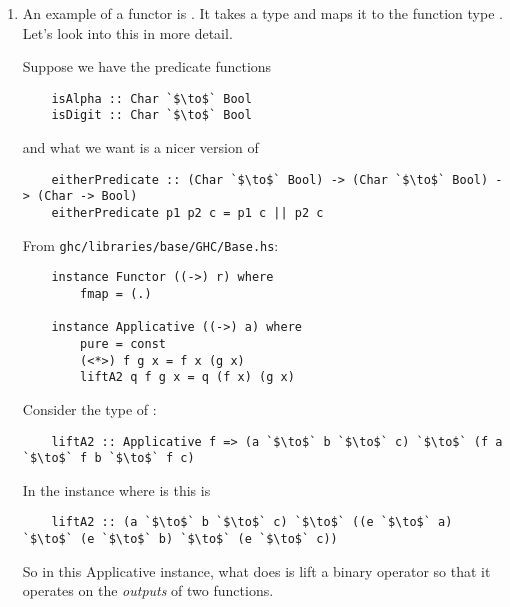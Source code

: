 \documentclass[12pt]{article}
\begin{document}
\begin{example*}\hspace{0pt}
  \begin{enumerate}

  \item An example of a functor is . It takes a type  and maps it to the
    function type . Let's look into this in more detail.

    Suppose we have the predicate functions
    \begin{verbatim}
    isAlpha :: Char `$\to$` Bool
    isDigit :: Char `$\to$` Bool
    \end{verbatim}
    and what we want is a nicer version of
    \begin{verbatim}
    eitherPredicate :: (Char `$\to$` Bool) -> (Char `$\to$` Bool) -> (Char -> Bool)
    eitherPredicate p1 p2 c = p1 c || p2 c
    \end{verbatim}

    \begin{mdframed}
    From {\tt ghc/libraries/base/GHC/Base.hs}:
    \begin{verbatim}
    instance Functor ((->) r) where
        fmap = (.)

    instance Applicative ((->) a) where
        pure = const
        (<*>) f g x = f x (g x)
        liftA2 q f g x = q (f x) (g x)
    \end{verbatim}
    \end{mdframed}

    Consider the type of :
    \begin{verbatim}
    liftA2 :: Applicative f => (a `$\to$` b `$\to$` c) `$\to$` (f a `$\to$` f b `$\to$` f c)
    \end{verbatim}
    In the instance where  is  this is
    \begin{verbatim}
    liftA2 :: (a `$\to$` b `$\to$` c) `$\to$` ((e `$\to$` a) `$\to$` (e `$\to$` b) `$\to$` (e `$\to$` c))
    \end{verbatim}
    So in this Applicative instance, what  does is lift a binary operator so that it
    operates on the {\it outputs} of two functions.


\end{enumerate}
\end{example*}
\end{document}
